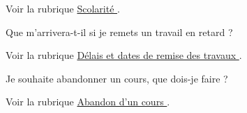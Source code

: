 \documentclass [12 pt]{article}
\begin{document}
                Voir la rubrique 
        \href{
        /pages/viewpage.action?pageId=124097998
        } {
        Scolarité
        }
    .
            
            Que m'arrivera-t-il si je remets un travail en retard ?
            
                Voir la rubrique 
        \href{
        https://wiki.umontreal.ca/pages/viewpage.action?pageId=124098029#délais
        } {
        Délais et dates de remise des travaux
        }
    .
            
            Je souhaite abandonner un cours, que dois-je faire ?
            
                Voir la rubrique 
        \href{
        /pages/viewpage.action?pageId=124097850
        } {
        Abandon d'un
                        cours
        }
    .
            
        
    

        
\end{document}
